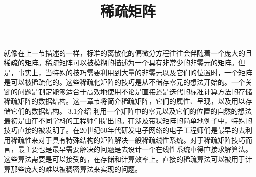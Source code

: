 \documentclass{article}
\begin{document}
  

\begin{CJK}{UTF8}{bsmi}  

\title{稀疏矩阵}
\date{}

\maketitle
就像在上一节描述的一样，标准的离散化的偏微分方程往往会伴随着一个庞大的且稀疏的矩阵。稀疏矩阵可以被模糊的描述为一个具有非常少的非零元的矩阵。但是，事实上，当特殊的技巧需要利用到大量的非零元以及它们的位置时，一个矩阵是可以被稀疏化的。这些稀疏化矩阵的技巧是从不储存零元的想法开始的。一个关键的问题是制定能够适合于高效地使用不论是直接还是迭代的标准计算方法的存储稀疏矩阵的数据结构。这一章节将简介稀疏矩阵，它们的属性、呈现，以及用以存储它们的数据结构。
\newline\newline
3.1介绍
\newline
利用一个矩阵中的零元以及它们的位置的自然的想法最初是由在不同学科的工程师们提出的。在涉及带状矩阵的简单地例子中，特殊的技巧直接的被发明了。在20世纪60年代研发电子网络的电子工程师们是最早的去利用稀疏性来对于具有特殊结构的矩阵解决一般稀疏线性系统。对于稀疏矩阵技巧而言，最主要也是最早需要解决的问题是去设计一个在线性系统中得直接求解算法。这些算法需要是可以接受的，在存储和计算效率上。直接的稀疏算法可以被用于计算那些庞大的难以被稠密算法来实现的问题。


\end{CJK}  
  
\end{document}
